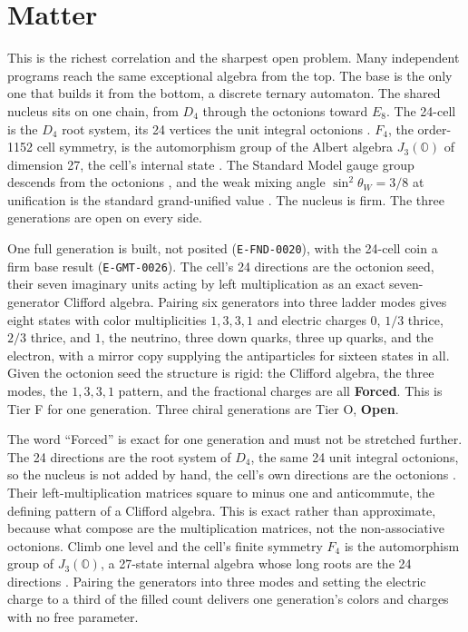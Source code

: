 \section{Matter}

This is the richest correlation and the sharpest open problem. Many independent
programs reach the same exceptional algebra from the top. The base is the only
one that builds it from the bottom, a discrete ternary automaton. The shared
nucleus sits on one chain, from $D_4$ through the octonions toward $E_8$. The
24-cell is the $D_4$ root system, its 24 vertices the unit integral octonions
\cite{coxeter1973, conway2003, hurwitz1898}. $F_4$, the order-1152 cell symmetry,
is the automorphism group of the Albert algebra $J_3(\mathbb{O})$ of dimension
27, the cell's internal state \cite{gunaydin1973}. The Standard Model gauge group
descends from the octonions \cite{furey2018, baez2002octonions}, and the weak
mixing angle $\sin^2\theta_W = 3/8$ at unification is the standard grand-unified
value \cite{georgi1974}. The nucleus is firm. The three generations are open on
every side.

\begin{finding}
One full generation is built, not posited (\texttt{E-FND-0020}), with the 24-cell coin a
firm base result (\texttt{E-GMT-0026}). The cell's 24 directions are the octonion seed,
their seven imaginary units acting by left multiplication as an exact
seven-generator Clifford algebra. Pairing six generators into three ladder
modes gives eight states with color multiplicities $1,3,3,1$ and electric
charges $0$, $1/3$ thrice, $2/3$ thrice, and $1$, the neutrino, three down
quarks, three up quarks, and the electron, with a mirror copy supplying the
antiparticles for sixteen states in all. Given the octonion seed the structure
is rigid: the Clifford algebra, the three modes, the $1,3,3,1$ pattern, and the
fractional charges are all \textbf{Forced}. This is Tier F for one generation.
Three chiral generations are Tier O, \textbf{Open}.
\end{finding}

The word ``Forced'' is exact for one generation and must not be stretched
further. The 24 directions are the root system of $D_4$, the same 24 unit
integral octonions, so the nucleus is not added by hand, the cell's own directions
are the octonions \cite{hurwitz1898}. Their left-multiplication matrices square
to minus one and anticommute, the defining pattern of a Clifford algebra. This is
exact rather than approximate, because what compose are the multiplication
matrices, not the non-associative octonions. Climb one level and the cell's
finite symmetry $F_4$ is the automorphism group of $J_3(\mathbb{O})$, a 27-state
internal algebra whose long roots are the 24 directions \cite{gunaydin1973,
baez2002octonions}. Pairing the generators into three modes and setting the
electric charge to a third of the filled count delivers one generation's colors
and charges with no free parameter.

